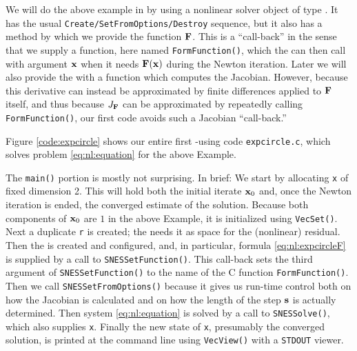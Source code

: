 We will do the above example in \PETSc by using a nonlinear solver object of type \pSNES.  It has the usual \texttt{Create/SetFromOptions/Destroy} sequence, but it also has a method by which we provide the function $\mathbf{F}$.  This is a ``call-back'' in the sense that we supply a function, here named \texttt{FormFunction()}, which the \pSNES can then call with argument $\mathbf{x}$ when it needs $\mathbf{F}(\mathbf{x})$ during the Newton iteration.  Later we will also provide the \pSNES with a function which computes the Jacobian.  However, because this derivative can instead be approximated by finite differences applied to $\mathbf{F}$ itself, and thus because $J_{\mathbf{F}}$ can be approximated by repeatedly calling \texttt{FormFunction()}, our first code avoids such a Jacobian ``call-back.''

Figure \ref{code:expcircle} shows our entire first \pSNES-using code \texttt{expcircle.c}, which solves problem \eqref{eq:nl:equation} for the above Example.

\vfill
{}

The \texttt{main()} portion is mostly not surprising.  In brief:  We start by allocating \pVec \texttt{x} of fixed dimension 2.  This will hold both the initial iterate $\mathbf{x}_0$ and, once the Newton iteration is ended, the converged estimate of the solution.  Because both components of $\mathbf{x}_0$ are $1$ in the above Example, it is initialized using \texttt{VecSet()}.  Next a duplicate \pVec \texttt{r} is created; the \pSNES needs it as space for the (nonlinear) residual.  Then the \pSNES is created and configured, and, in particular, formula \eqref{eq:nl:expcircleF} is supplied by a call to \texttt{SNESSetFunction()}.  This call-back sets the third argument of \texttt{SNESSetFunction()} to the name of the C function \texttt{FormFunction()}.  Then we call \texttt{SNESSetFromOptions()} because it gives us run-time control both on how the Jacobian is calculated and on how the length of the step $\mathbf{s}$ is actually determined.  Then system \eqref{eq:nl:equation} is solved by a call to \texttt{SNESSolve()}, which also supplies \pVec \texttt{x}.  Finally the new state of \texttt{x}, presumably the converged solution, is printed at the command line using \texttt{VecView()} with a \texttt{STDOUT} viewer.

